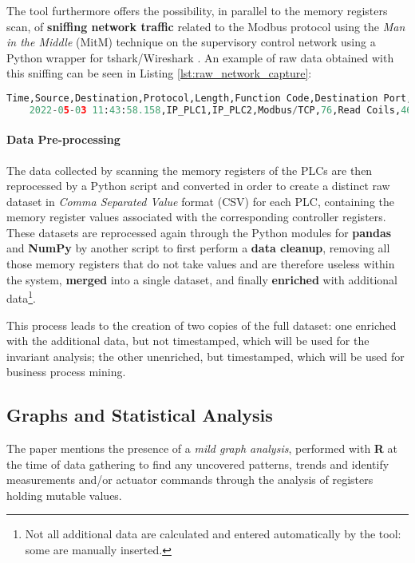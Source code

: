 \bigskip
The tool furthermore offers the possibility, in parallel to the memory registers scan, of \textbf{sniffing network traffic} related to the Modbus protocol using the \textit{Man in the Middle} (MitM) technique on the supervisory control network using a Python wrapper for tshark/Wireshark \cite{tshark} \cite{wireshark}. An example of raw data obtained with this sniffing can be seen in Listing \ref{lst:raw_network_capture}:

\begin{lstlisting}[language=Python, numbers=none, caption=Example of raw network capture, label=lst:raw_network_capture]	
	Time,Source,Destination,Protocol,Length,Function Code,Destination Port,Source Port,Data,Frame length on the wire,Bit Value,Request Frame,Reference Number,Info
	2022-05-03 11:43:58.158,IP_PLC1,IP_PLC2,Modbus/TCP,76,Read Coils,46106,502,,76,TRUE,25,,"Response: Trans: 62; Unit: 1, Func: 1: Read Coils"
\end{lstlisting}

\paragraph{Data Pre-processing} 
The data collected by scanning the memory registers of the PLCs are then reprocessed by a Python script and converted in order to create a distinct raw dataset in \textit{Comma Separated Value} format (CSV) for each PLC, containing the memory register values associated with the corresponding controller registers. These datasets are reprocessed again through the Python modules for \textbf{pandas} \cite{pandas} and \textbf{NumPy} \cite{numpy} by another script to first perform a \textbf{data cleanup}, removing all those memory registers that do not take values and are therefore useless within the system, \textbf{merged} into a single dataset, and finally \textbf{enriched} with additional data\footnote{Not all additional data are calculated and entered automatically by the tool: some are manually inserted.}.

\bigskip
This process leads to the creation of two copies of the full dataset: one enriched with the additional data, but not timestamped, which will be used for the invariant analysis; the other unenriched, but timestamped, which will be used for business process mining.

\subsection{Graphs and Statistical Analysis}
\label{subsec:ceccato_graphanalysis}
The paper mentions the presence of a \textit{mild graph analysis}, performed with \textbf{R} \cite{r-project} at the time of data gathering to find any uncovered patterns, trends and identify measurements and/or actuator commands through the analysis of registers holding mutable values. 

